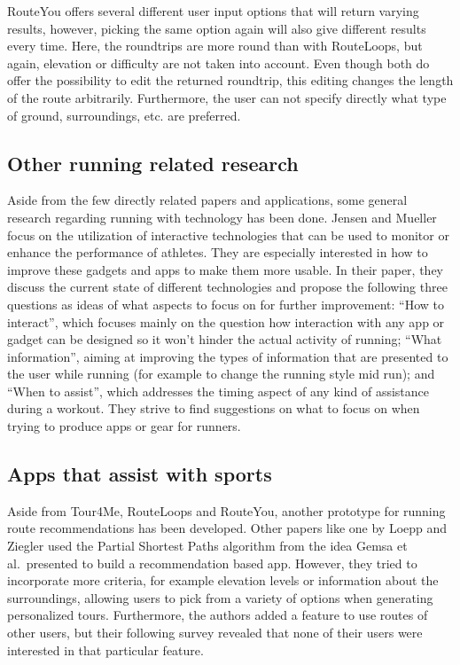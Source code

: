 RouteYou offers several different user input options that will return varying results, however, picking the same option again will also give different results every time.   
Here, the roundtrips are more round than with RouteLoops, but again, elevation or difficulty are not taken into account. 
Even though both do offer the possibility to edit the returned roundtrip, this editing changes the length of the route arbitrarily.
Furthermore, the user can not specify directly what type of ground, surroundings, etc. are preferred. 




\subsection{Other running related research}
\label{subsec:otherRunningResearch}

Aside from the few directly related papers and applications, some general research regarding running with technology has been done.
Jensen and Mueller \cite{jensen_running_2014} focus on the utilization of interactive technologies that can be used to monitor or enhance the performance of athletes.
They are especially interested in how to improve these gadgets and apps to make them more usable. 
In their paper, they discuss the current state of different technologies and propose the following three questions as ideas of what aspects to focus on for further improvement:
\enquote{How to interact}, which focuses mainly on the question how interaction with any app or gadget can be designed so it won't hinder the actual activity of running;
\enquote{What information}, aiming at improving the types of information that are presented to the user while running (for example to change the running style mid run);
and \enquote{When to assist}, which addresses the timing aspect of any kind of assistance during a workout. 
They strive to find suggestions on what to focus on when trying to produce apps or gear for runners.



\subsection{Apps that assist with sports}
\label{subsec:runningApps}

Aside from Tour4Me, RouteLoops and RouteYou, another prototype for running route recommendations has been developed.
Other papers like one by Loepp and Ziegler \cite{loepp_recommending_2018} used the Partial Shortest Paths algorithm from the idea Gemsa et al.\ presented \cite{gemsa_efficient_2013} to build a recommendation based app.
However, they tried to incorporate more criteria, for example elevation levels or information about the surroundings, allowing users to pick from a variety of options when generating personalized tours. 
Furthermore, the authors added a feature to use routes of other users, but their following survey revealed that none of their users were interested in that particular feature.

